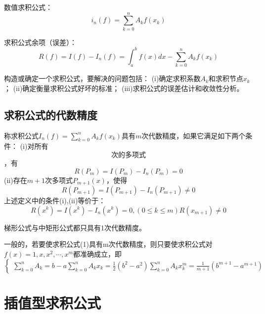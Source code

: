 数值求积公式：
\begin{equation}\label{eqn:(1)}
     i_n(f) = \sum_{k=0}^{n}A_kf(x_k)   
\end{equation}

求积公式余项（误差）：
\begin{equation}\label{eqn:(2)}
    R(f) = I(f)-I_n(f) = \int_{a}^{b}f(x)dx-\sum_{k=0}^{n} A_kf(x_k)
\end{equation}

构造或确定一个求积公式，要解决的问题包括：
(i)确定求积系数$A_k$和求积节点$x_k$；
(ii)确定衡量求积公式好坏的标准；
(iii)求积公式的误差估计和收敛性分析。

\subsection{求积公式的代数精度}

\begin{definition}
    称求积公式$I_n(f)=\sum_{k=0}^{n}A_kf(x_k)$具有$m$次代数精度，如果它满足如下两个条件：
    (i)对所有$$次的多项式$$，有
    \begin{equation*}
        R(P_m) = I(P_m)-I_n(P_m) = 0
    \end{equation*}
    (ii)存在$m+1$次多项式$P_{m+1}(x)$，使得
    \begin{equation*}
        R(P_{m+1}) = I(P_{m+1})-I_n(P_{m+1}) \neq 0
    \end{equation*}
    上述定义中的条件(i),(ii)等价于：
    \begin{equation*}
         R(x^k) = I(x^k)-I_n(x^k) = 0,(0\leq k\leq m)
         R(x_{m+1})\neq 0
    \end{equation*}
    \begin{remark}
        梯形公式与中矩形公式都只具有1次代数精度。
    \end{remark}
\end{definition}



一般的，若要使求积公式(1)具有m次代数精度，则只要使求积公式对$f(x) = 1,x,x^2,\cdots,x^m$都准确成立，即
\begin{equation*}
    \begin{cases}
        \sum_{k=0}^{n}A_k = b-a
        \sum_{k=0}^{n}A_kx_k = \frac{1}{2}(b^2-a^2)
        \sum_{k=0}^{n}A_kx^m_k = \frac{1}{m+1}(b^{m+1}-a^{m+1})
    \end{cases}
\end{equation*}

\section{插值型求积公式}


